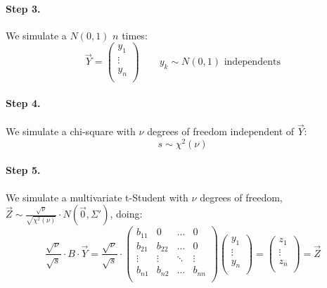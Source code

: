 \documentclass[a4paper,12pt,final]{article}
\begin{document}
\paragraph{Step 3.} We simulate a $N(0,1)$ $n$ times:
\begin{displaymath}
\vec{Y} =
\left(
\begin{array}{c}
y_1    \\
\vdots \\
y_n    \\
\end{array}
\right) 
\qquad y_k \sim N(0,1) \textrm{ independents}
\end{displaymath}

\paragraph{Step 4.} We simulate a chi-square with $\nu$ degrees of freedom 
independent of $\vec{Y}$:
\begin{displaymath}
s \sim \chi^2(\nu)
\end{displaymath}

\paragraph{Step 5.} We simulate a multivariate t-Student with $\nu$ degrees of freedom, 
$\vec{Z} \sim \frac{\sqrt{\nu}}{\sqrt{\chi^2(\nu)}} \cdot N(\vec{0}, \Sigma')$, doing:
\begin{displaymath}
\frac{\sqrt{\nu}}{\sqrt{s}} \cdot B \cdot \vec{Y} 
=
\frac{\sqrt{\nu}}{\sqrt{s}} \cdot 
\left(
\begin{array}{cccc}
b_{11}   & 0        & \ldots & 0       \\
b_{21}   & b_{22}   & \ldots & 0       \\
\vdots  & \vdots  & \ddots & \vdots    \\
b_{n1}   & b_{n2}   & \ldots & b_{nn}  \\
\end{array}
\right)
\left(
\begin{array}{c}
y_1    \\
\vdots \\
y_n    \\
\end{array}
\right) 
=
\left(
\begin{array}{c}
z_1    \\
\vdots \\
z_n    \\
\end{array}
\right) 
= 
\vec{Z}
\end{displaymath}
\end{document}
